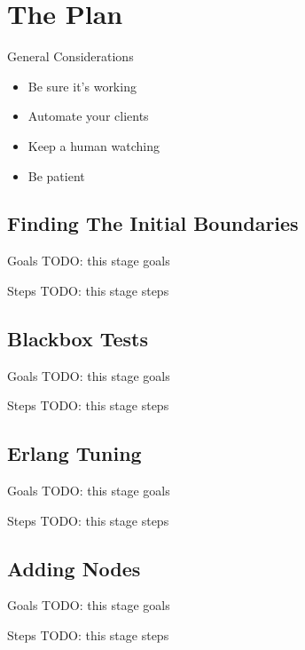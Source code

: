 \documentclass[utf8]{beamer}
\begin{document}
\section{The Plan}
\begin{frame}{General Considerations}
	\begin{itemize}
		\item<1,5> Be sure it's working
		\item<2,5> Automate your clients
		\item<3,5> Keep a human watching
		\item<4,5> Be patient
	\end{itemize}
\end{frame}

\subsection{Finding The Initial Boundaries}
\begin{frame}{Goals}
	TODO: this stage goals
\end{frame}
\begin{frame}{Steps}
	TODO: this stage steps
\end{frame}

\subsection{Blackbox Tests}
\begin{frame}{Goals}
	TODO: this stage goals
\end{frame}
\begin{frame}{Steps}
	TODO: this stage steps
\end{frame}

\subsection{Erlang Tuning}
\begin{frame}{Goals}
	TODO: this stage goals
\end{frame}
\begin{frame}{Steps}
	TODO: this stage steps
\end{frame}

\subsection{Adding Nodes}
\begin{frame}{Goals}
	TODO: this stage goals
\end{frame}
\begin{frame}{Steps}
	TODO: this stage steps
\end{frame}
\end{document}
